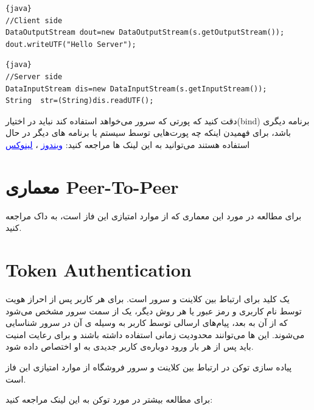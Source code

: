 \documentclass[]{article}
\begin{document}
\begin{enumerate}
\begin{latin}
\begin{lstlisting}{java}
//Client side
DataOutputStream dout=new DataOutputStream(s.getOutputStream());  dout.writeUTF("Hello Server");  			
\end{lstlisting}

\end{latin}

\begin{latin}

\begin{lstlisting}{java}
//Server side
DataInputStream dis=new DataInputStream(s.getInputStream());
String  str=(String)dis.readUTF();  

\end{lstlisting}

\end{latin}



\end{enumerate}

دقت کنید که پورتی که سرور می‌خواهد استفاده کند نباید در اختیار(bind) برنامه دیگری باشد، برای فهمیدن اینکه چه پورت‌هایی توسط سیستم یا برنامه های دیگر در حال استفاده هستند می‌توانید به این لینک ها مراجعه کنید:
\href{https://www.howtogeek.com/howto/28609/how-can-i-tell-what-is-listening-on-a-tcpip-port-in-windows/}{\textcolor{blue}{\underline{{ ویندوز}}}}
  ،
   \href{https://www.cyberciti.biz/faq/unix-linux-check-if-port-is-in-use-command/}{\textcolor{blue}{\underline{{لینوکس}}}}


\section*{{\titr معماری Peer-To-Peer}}

برای مطالعه در مورد این معماری که از موارد امتیازی این فاز است، به \textcolor{CustomColor}{داک } مراجعه کنید.


\section*{{\titr Token Authentication }}

 یک کلید برای ارتباط بین کلاینت و سرور است. برای هر کاربر پس از احراز هویت توسط نام کاربری و رمز عبور یا هر روش دیگر، یک   از سمت سرور مشخص می‌شود که از آن به بعد، پیام‌های ارسالی توسط کاربر به وسیله ی آن  در سرور شناسایی می‌شوند. این  ها می‌توانند محدودیت زمانی استفاده داشته باشند و برای رعایت امنیت باید پس از هر بار ورود دوباره‌ی کاربر  جدیدی به او اختصاص داده شود.

پیاده سازی توکن در ارتباط بین کلاینت و سرور فروشگاه از موارد امتیازی این فاز است.

برای مطالعه بیشتر در مورد توکن به این لینک مراجعه کنید:


\begin{center}
\href{https://scotch.io/tutorials/the-ins-and-outs-of-token-based-authentication}{\textcolor{blue}{\underline{}}}

\end{center}
\end{document}
